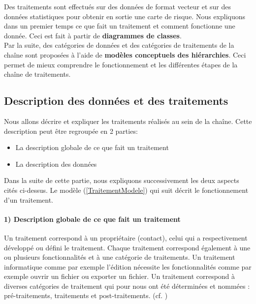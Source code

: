 Des traitements sont effectués sur des données de format vecteur et sur des données statistiques pour obtenir en sortie une carte de risque.
Nous expliquons dans un premier temps ce que fait un traitement et comment fonctionne une donnée. Ceci est fait à partir de \textbf{diagrammes de classes}.\\
Par la suite, des catégories de données et des catégories de traitements de la chaîne sont proposées à l'aide de \textbf{modèles conceptuels des hiérarchies}. Ceci permet de mieux comprendre le fonctionnement et les différentes étapes de la chaîne de traitements.\\


\subsection{Description des données et des traitements}

Nous allons décrire et expliquer les traitements réalisés au sein de la chaîne. Cette description peut être regroupée en 2 parties: \\

\begin{itemize}
\item La description globale de ce que fait un traitement
\item La description des données\\
\end{itemize}

Dans la suite de cette partie, nous expliquons successivement les deux aspects cités ci-dessus. Le modèle (\ref{TraitementModele}) qui suit décrit le fonctionnement d'un traitement.



\paragraph{1) Description globale de ce que fait un traitement\\}

Un traitement correspond à un propriétaire (contact), celui qui a respectivement développé ou défini le traitement. Chaque traitement correspond également à une ou plusieurs fonctionnalités et à une catégorie de traitements. Un traitement informatique comme par exemple l'édition nécessite les fonctionnalités comme par exemple ouvrir un fichier ou exporter un fichier. Un traitement correspond à diverses catégories de traitement qui pour nous ont été déterminées et nommées : pré-traitements, traitements et post-traitements. (cf. \citep{Lin2011})\\

